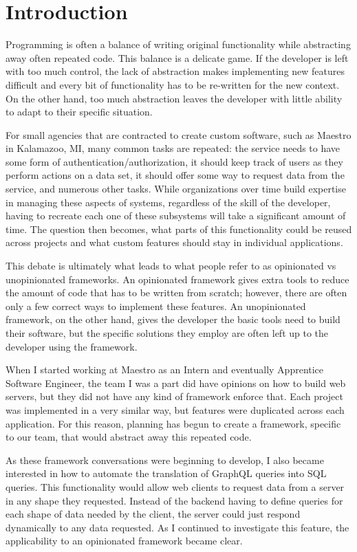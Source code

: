 \section{Introduction}

Programming is often a balance of writing original functionality while abstracting away often repeated code.  This balance is a delicate game.  If the developer is left with too much control, the lack of abstraction makes implementing new features difficult and every bit of functionality has to be re-written for the new context.  On the other hand, too much abstraction leaves the developer with little ability to adapt to their specific situation.

For small agencies that are contracted to create custom software, such as Maestro in Kalamazoo, MI, many common tasks are repeated:  the service needs to have some form of authentication/authorization, it should keep track of users as they perform actions on a data set, it should offer some way to request data from the service, and numerous other tasks.  While organizations over time build expertise in managing these aspects of systems, regardless of the skill of the developer, having to recreate each one of these subsystems will take a significant amount of time.  The question then becomes, what parts of this functionality could be reused across projects and what custom features should stay in individual applications.

This debate is ultimately what leads to what people refer to as opinionated vs unopinionated frameworks.  An opinionated framework gives extra tools to reduce the amount of code that has to be written from scratch; however, there are often only a few correct ways to implement these features.  An unopinionated framework, on the other hand, gives the developer the basic tools need to build their software, but the specific solutions they employ are often left up to the developer using the framework.

When I started working at Maestro as an Intern and eventually Apprentice Software Engineer, the team I was a part did have opinions on how to build web servers, but they did not have any kind of framework enforce that.  Each project was implemented in a very similar way, but features were duplicated across each application.  For this reason, planning has begun to create a framework, specific to our team, that would abstract away this repeated code.

As these framework conversations were beginning to develop, I also became interested in how to automate the translation of GraphQL queries into SQL queries.  This functionality would allow web clients to request data from a server in any shape they requested.  Instead of the backend having to define queries for each shape of data needed by the client, the server could just respond dynamically to any data requested.  As I continued to investigate this feature, the applicability to an opinionated framework became clear.

